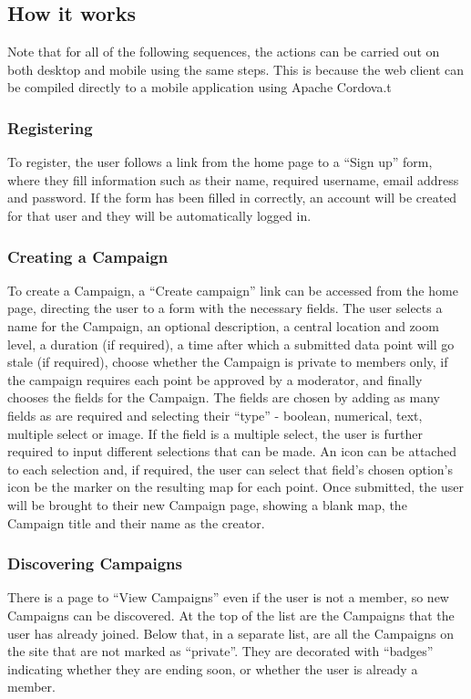 \documentclass{article}
\begin{document}
		\subsection{How it works}

		Note that for all of the following sequences, the actions can be carried out on both desktop and mobile using the same steps. This is because the web client can be compiled directly to a mobile application using Apache Cordova\cite{_apache_????}.t

		\subsubsection{Registering}
		To register, the user follows a link from the home page to a ``Sign up'' form, where they fill information such as their name, required username, email address and password. If the form has been filled in correctly, an account will be created for that user and they will be automatically logged in.

		\subsubsection{Creating a Campaign}
		To create a Campaign, a ``Create campaign'' link can be accessed from the home page, directing the user to a form with the necessary fields. The user selects a name for the Campaign, an optional description, a central location and zoom level, a duration (if required), a time after which a submitted data point will go stale (if required), choose whether the Campaign is private to members only, if the campaign requires each point be approved by a moderator, and finally chooses the fields for the Campaign. The fields are chosen by adding as many fields as are required and selecting their ``type'' - boolean, numerical, text, multiple select or image. If the field is a multiple select, the user is further required to input different selections that can be made. An icon can be attached to each selection and, if required, the user can select that field's chosen option's icon be the marker on the resulting map for each point. Once submitted, the user will be brought to their new Campaign page, showing a blank map, the Campaign title and their name as the creator.

		\subsubsection{Discovering Campaigns}
		There is a page to ``View Campaigns'' even if the user is not a member, so new Campaigns can be discovered. At the top of the list are the Campaigns that the user has already joined. Below that, in a separate list, are all the Campaigns on the site that are not marked as ``private''. They are decorated with ``badges'' indicating whether they are ending soon, or whether the user is already a member.
\end{document}
